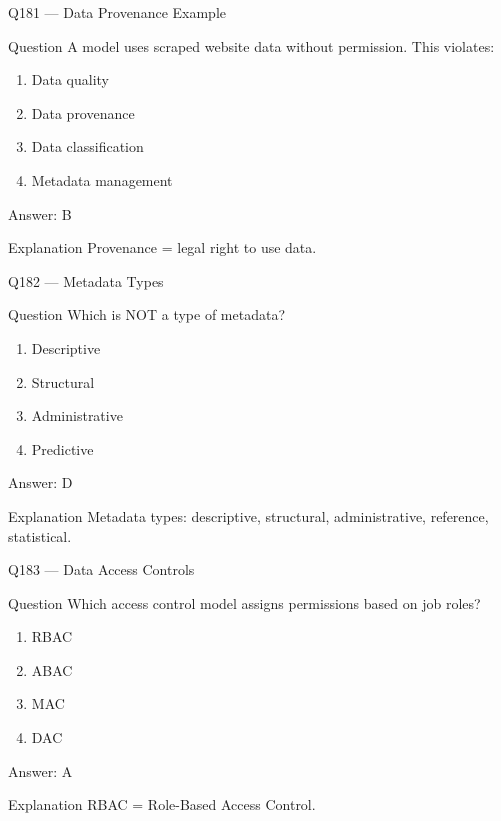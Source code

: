 \documentclass[aspectratio=169,8pt]{beamer}
\begin{document}
	\begin{frame}{Q181 --- Data Provenance Example}
		\begin{block}{Question}
			A model uses scraped website data without permission. This violates:
		\end{block}
		\begin{enumerate}
			\item Data quality
			\item Data provenance
			\item Data classification
			\item Metadata management
		\end{enumerate}
		\begin{exampleblock}{Answer: B}\end{exampleblock}
		\begin{block}{Explanation}
			Provenance = legal right to use data.
		\end{block}
	\end{frame}
	
	\begin{frame}{Q182 --- Metadata Types}
		\begin{block}{Question}
			Which is NOT a type of metadata?
		\end{block}
		\begin{enumerate}
			\item Descriptive
			\item Structural
			\item Administrative
			\item Predictive
		\end{enumerate}
		\begin{exampleblock}{Answer: D}\end{exampleblock}
		\begin{block}{Explanation}
			Metadata types: descriptive, structural, administrative, reference, statistical.
		\end{block}
	\end{frame}
	
	\begin{frame}{Q183 --- Data Access Controls}
		\begin{block}{Question}
			Which access control model assigns permissions based on job roles?
		\end{block}
		\begin{enumerate}
			\item RBAC
			\item ABAC
			\item MAC
			\item DAC
		\end{enumerate}
		\begin{exampleblock}{Answer: A}\end{exampleblock}
		\begin{block}{Explanation}
			RBAC = Role-Based Access Control.
		\end{block}
	\end{frame}
	
\end{document}
